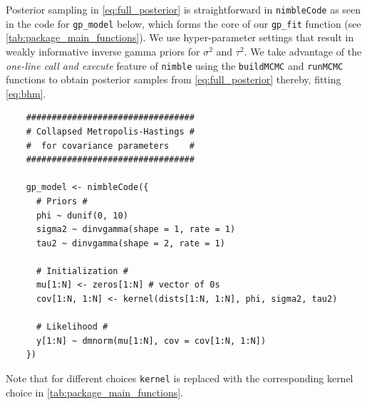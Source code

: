     Posterior sampling in \ref{eq:full_posterior} is straightforward in \texttt{nimbleCode} as seen in the code for \texttt{gp\_model} below, which forms the core of our \texttt{gp\_fit} function (see \ref{tab:package_main_functions}). { We use hyper-parameter settings that result in weakly informative inverse gamma priors for $\sigma^2$ and $\tau^2$.} We take advantage of the \emph{one-line call and execute} feature of \texttt{nimble} using the \texttt{buildMCMC} and \texttt{runMCMC} functions to obtain posterior samples from \ref{eq:full_posterior} thereby, fitting \ref{eq:bhm}.
    \begin{verbatim}
    #################################
    # Collapsed Metropolis-Hastings #
    #  for covariance parameters    #
    #################################

    gp_model <- nimbleCode({
      # Priors #
      phi ~ dunif(0, 10)
      sigma2 ~ dinvgamma(shape = 1, rate = 1)
      tau2 ~ dinvgamma(shape = 2, rate = 1)

      # Initialization #
      mu[1:N] <- zeros[1:N] # vector of 0s
      cov[1:N, 1:N] <- kernel(dists[1:N, 1:N], phi, sigma2, tau2)

      # Likelihood #
      y[1:N] ~ dmnorm(mu[1:N], cov = cov[1:N, 1:N])
    })
    \end{verbatim}
    Note that for different choices \texttt{kernel} is replaced with the corresponding kernel choice in \ref{tab:package_main_functions}.



